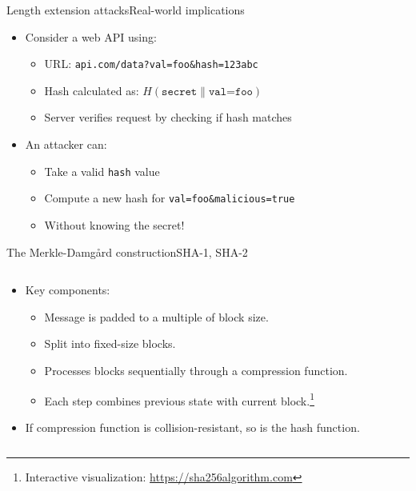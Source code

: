 \documentclass[aspectratio=169, lualatex, handout]{beamer}
\begin{document}
\begin{frame}{Length extension attacks}{Real-world implications}
	\begin{itemize}[<+->]
		\item Consider a web API using:
		      \begin{itemize}
			      \item URL: \texttt{api.com/data?val=foo\&hash=123abc}
			      \item Hash calculated as: $H(\texttt{secret} \| \texttt{val=foo})$
			      \item Server verifies request by checking if hash matches
		      \end{itemize}
		\item An attacker can:
		      \begin{itemize}
			      \item Take a valid \texttt{hash} value
			      \item Compute a new hash for \texttt{val=foo\&malicious=true}
			      \item Without knowing the secret!
		      \end{itemize}
	\end{itemize}
\end{frame}

\begin{frame}{The Merkle-Damg\aa rd construction}{SHA-1, SHA-2}
	\begin{columns}[c]
		\begin{column}{0.5\textwidth}
			\begin{itemize}[<+->]
				\item Key components:
				      \begin{itemize}
					      \item Message is padded to a multiple of block size.
					      \item Split into fixed-size blocks.
					      \item Processes blocks sequentially through a compression function.
					      \item Each step combines previous state with current block.\footnote{Interactive visualization: \url{https://sha256algorithm.com}}
				      \end{itemize}
				\item If compression function is collision-resistant, so is the hash function.
			\end{itemize}
		\end{column}
		\begin{column}{0.5\textwidth}
		\end{column}
	\end{columns}
\end{frame}
\end{document}
